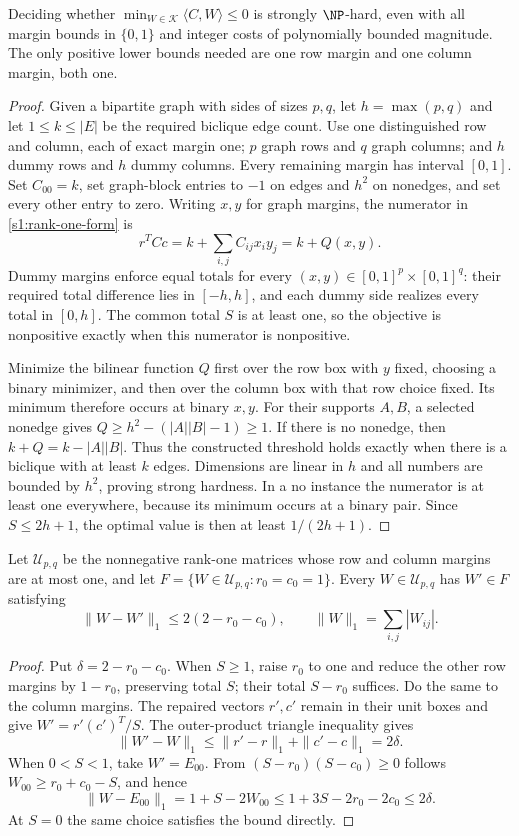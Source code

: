 \begin{theorem}\label{app:margin-hardness}
Deciding whether $\min_{W\in\mathcal K}\langle C,W\rangle\le0$ is
strongly $\NP$-hard, even with all margin bounds in $\{0,1\}$ and
integer costs of polynomially bounded magnitude. The only positive
lower bounds needed are one row margin and one column margin, both one.
\end{theorem}
\begin{proof}
Given a bipartite graph with sides of sizes $p,q$, let
$h=\max(p,q)$ and let $1\le k\le|E|$ be the required biclique edge
count. Use one distinguished row and column, each of exact margin one;
$p$ graph rows and $q$ graph columns; and $h$ dummy rows and $h$ dummy
columns. Every remaining margin has interval $[0,1]$. Set $C_{00}=k$,
set graph-block entries to $-1$ on edges and $h^2$ on nonedges, and
set every other entry to zero. Writing $x,y$ for graph margins,
the numerator in \eqref{s1:rank-one-form} is
\[
 r^TCc=k+\sum_{i,j}C_{ij}x_i y_j=k+Q(x,y).
\]
Dummy margins enforce equal totals for every
$(x,y)\in[0,1]^p\times[0,1]^q$: their required total difference lies
in $[-h,h]$, and each dummy side realizes every total in $[0,h]$.
The common total $S$ is at least one, so the objective is nonpositive
exactly when this numerator is nonpositive.

Minimize the bilinear function $Q$ first over the row box with $y$
fixed, choosing a binary minimizer, and then over the column box with
that row choice fixed. Its minimum therefore occurs at binary $x,y$.
For their supports $A,B$, a selected nonedge gives
$Q\ge h^2-(|A||B|-1)\ge1$. If there is no nonedge, then
$k+Q=k-|A||B|$. Thus the constructed threshold holds exactly when
there is a biclique with at least $k$ edges. Dimensions are linear in
$h$ and all numbers are bounded by $h^2$, proving strong hardness.
In a no instance the numerator is at least one everywhere, because
its minimum occurs at a binary pair. Since $S\le2h+1$, the optimal
value is then at least $1/(2h+1)$.
\end{proof}

\begin{lemma}\label{app:unit-repair}
Let $\mathcal U_{p,q}$ be the nonnegative rank-one matrices whose row
and column margins are at most one, and let
$F=\{W\in\mathcal U_{p,q}:r_0=c_0=1\}$. Every
$W\in\mathcal U_{p,q}$ has $W'\in F$ satisfying
\[
 \|W-W'\|_1\le2(2-r_0-c_0),
 \qquad \|W\|_1=\sum_{i,j}|W_{ij}|.
\]
\end{lemma}
\begin{proof}
Put $\delta=2-r_0-c_0$. When $S\ge1$, raise $r_0$ to one and
reduce the other row margins by $1-r_0$, preserving total $S$;
their total $S-r_0$ suffices. Do the same to the column margins.
The repaired vectors $r',c'$ remain in their unit boxes and give
$W'=r'(c')^T/S$. The outer-product triangle inequality gives
\[
 \|W'-W\|_1\le\|r'-r\|_1+\|c'-c\|_1=2\delta.
\]
When $0<S<1$, take $W'=E_{00}$. From
$(S-r_0)(S-c_0)\ge0$ follows $W_{00}\ge r_0+c_0-S$, and hence
\[
 \|W-E_{00}\|_1=1+S-2W_{00}
 \le1+3S-2r_0-2c_0\le2\delta.
\]
At $S=0$ the same choice satisfies the bound directly.
\end{proof}


